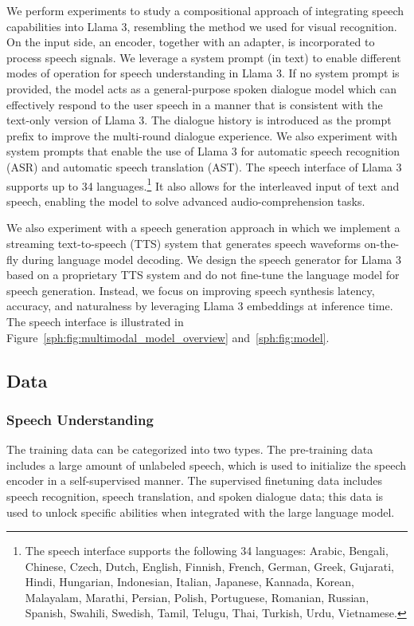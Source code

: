 We perform experiments to study a compositional approach of integrating speech capabilities into Llama 3, resembling the method we used for visual recognition. On the input side, an encoder, together with an adapter, is incorporated to process speech signals. We leverage a system prompt (in text) to enable different modes of operation for speech understanding in Llama 3. If no system prompt is provided, the model acts as a general-purpose spoken dialogue model which can effectively respond to the user speech in a manner that is consistent with the text-only version of Llama 3. The dialogue history is introduced as the prompt prefix to improve the multi-round dialogue experience. We also experiment with system prompts that enable the use of Llama 3 for automatic speech recognition (ASR) and automatic speech translation (AST). The speech interface of Llama 3 supports up to 34 languages.\footnote{The speech interface supports the following 34 languages: Arabic, Bengali, Chinese, Czech, Dutch, English, Finnish, French, German, Greek, Gujarati, Hindi, Hungarian, Indonesian, Italian, Japanese, Kannada, Korean, Malayalam, Marathi, Persian, Polish, Portuguese, Romanian, Russian, Spanish, Swahili, Swedish, Tamil, Telugu, Thai, Turkish, Urdu, Vietnamese.} It also allows for the interleaved input of text and speech, enabling the model to solve advanced audio-comprehension tasks.

We also experiment with a speech generation approach in which we implement a streaming text-to-speech (TTS) system that generates speech waveforms on-the-fly during language model decoding. We design the speech generator for Llama 3 based on a proprietary TTS system and do not fine-tune the language model for speech generation. Instead, we focus on improving speech synthesis latency, accuracy, and naturalness by leveraging Llama 3 embeddings at inference time. The speech interface is illustrated in Figure~\ref{sph:fig:multimodal_model_overview} and~\ref{sph:fig:model}.

\subsection{Data}

\subsubsection{Speech Understanding}

The training data can be categorized into two types. The pre-training data includes a large amount of unlabeled speech, which is used to initialize the speech encoder in a self-supervised manner. The supervised finetuning data includes speech recognition, speech translation, and spoken dialogue data; this data is used to unlock specific abilities when integrated with the large language model.

